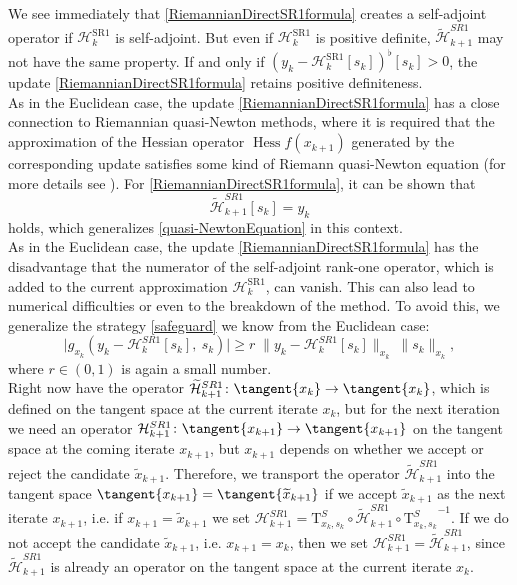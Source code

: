 We see immediately that \cref{RiemannianDirectSR1formula} creates a self-adjoint operator if $\mathcal{H}^\mathrm{SR1}_k$ is self-adjoint. But even if $\mathcal{H}^\mathrm{SR1}_k$ is positive definite, $\widetilde{\mathcal{H}}^{SR1}_{k+1}$ may not have the same property. If and only if $(y_k - \mathcal{H}^\mathrm{SR1}_k [s_k])^{\flat} [s_k] > 0$, the update \cref{RiemannianDirectSR1formula} retains positive definiteness. \\
As in the Euclidean case, the update \cref{RiemannianDirectSR1formula} has a close connection to Riemannian quasi-Newton methods, where it is required that the approximation of the Hessian operator $\operatorname{Hess} f(x_{k+1})$ generated by the corresponding update satisfies some kind of Riemann quasi-Newton equation (for more details see \cite[Chapter~2]{Huang:2013}). For \cref{RiemannianDirectSR1formula}, it can be shown that 
\begin{equation*}
    \widetilde{\mathcal{H}}^{SR1}_{k+1} [s_k] = y_k 
\end{equation*}
holds, which generalizes \cref{quasi-NewtonEquation} in this context. \\
As in the Euclidean case, the update \cref{RiemannianDirectSR1formula} has the disadvantage that the numerator of the self-adjoint rank-one operator, which is added to the current approximation $\mathcal{H}^\mathrm{SR1}_k$, can vanish. This can also lead to numerical difficulties or even to the breakdown of the method. To avoid this, we generalize the strategy \cref{safeguard} we know from the Euclidean case: 
\begin{equation}\label{RiemannianSafeguard}
    \lvert g_{x_k}(y_k - \mathcal{H}^{SR1}_k[s_k], \ s_k) \rvert \geq r \; \lVert y_k - \mathcal{H}^{SR1}_k[s_k] \rVert_{x_k} \ \lVert s_k \rVert_{x_k},
\end{equation}
where $r \in (0, 1)$ is again a small number. \\
Right now have the operator $\widetilde{\mathcal{H}}^{SR1}_{k+1} \colon \tangent{x_k} \to \tangent{x_k}$, which is defined on the tangent space at the current iterate $x_k$, but for the next iteration we need an operator $\mathcal{H}^{SR1}_{k+1} \colon \tangent{x_{k+1}} \to \tangent{x_{k+1}}$ on the tangent space at the coming iterate $x_{k+1}$, but $x_{k+1}$ depends on whether we accept or reject the candidate $\widetilde{x}_{k+1}$. Therefore, we transport the operator $\widetilde{\mathcal{H}}^{SR1}_{k+1}$ into the tangent space $\tangent{x_{k+1}} = \tangent{\widetilde{x}_{k+1}}$ if we accept $\widetilde{x}_{k+1}$ as the next iterate $x_{k+1}$, i.e. if $x_{k+1} = \widetilde{x}_{k+1}$ we set $\mathcal{H}^{SR1}_{k+1} = \mathrm{T}^{S}_{x_k, s_k} \circ \widetilde{\mathcal{H}}^{SR1}_{k+1} \circ {\mathrm{T}^{S}_{x_k, s_k}}^{-1}$. If we do not accept the candidate $\widetilde{x}_{k+1}$, i.e. $x_{k+1} = x_k$, then we set $\mathcal{H}^{SR1}_{k+1} = \widetilde{\mathcal{H}}^{SR1}_{k+1}$, since $\widetilde{\mathcal{H}}^{SR1}_{k+1}$ is already an operator on the tangent space at the current iterate $x_k$. \\

